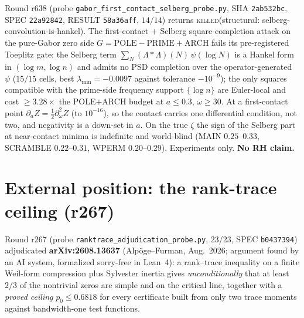 \documentclass[11pt]{article}
\theoremstyle{definition}
\theoremstyle{remark}
\begin{document}
\noindent Round r638 (probe \texttt{gabor\_first\_contact\_selberg\_probe.py},
SHA \texttt{2ab532bc}, SPEC \texttt{22a92842}, RESULT
\texttt{58a36aff}, $14/14$) returns
\textsc{killed}(structural: selberg-convolution-is-hankel).
The first-contact $+$ Selberg square-completion attack on the
pure-Gabor zero side $G=\mathrm{POLE}-\mathrm{PRIME}+\mathrm{ARCH}$
fails its pre-registered Toeplitz gate: the Selberg term
$\sum_N(\Lambda*\Lambda)(N)\,\psi(\log N)$ is a Hankel form in
$(\log m,\log n)$ and admits no PSD completion over the
operator-generated $\psi$ ($15/15$ cells, best
$\lambda_{\min}=-0.0097$ against tolerance $-10^{-9}$); the only
squares compatible with the prime-side frequency support
$\{\log n\}$ are Euler-local and cost $\ge 3.28\times$ the
POLE$+$ARCH budget at $a\le 0.3$, $\omega\ge 30$.  At a
first-contact point $\partial_aZ=\tfrac12\partial_\omega^2Z$ (to
$10^{-16}$), so the contact carries one differential condition,
not two, and negativity is a down-set in $a$.  On the true
$\zeta$ the sign of the Selberg part at near-contact minima is
indefinite and world-blind (MAIN $0.25$--$0.33$, SCRAMBLE
$0.22$--$0.31$, WPERM $0.20$--$0.29$).  Experiments only.
\textbf{No RH claim.}

\section{External position: the rank-trace ceiling (r267)}\label{sec:external}

Round r267 (probe \texttt{ranktrace\_adjudication\_probe.py}, 23/23, SPEC
\texttt{b0437394}) adjudicated \textbf{arXiv:2608.13637} (Alp\"oge--Furman,
Aug.~2026; argument found by an AI system, formalized sorry-free in
Lean~4): a rank--trace inequality on a finite Weil-form compression plus
Sylvester inertia gives \emph{unconditionally} that at least $2/3$ of the
nontrivial zeros are simple and on the critical line, together with a
\emph{proved ceiling} $p_0\le0.6818$ for every certificate built from only
two trace moments against bandwidth-one test functions.
\end{document}
